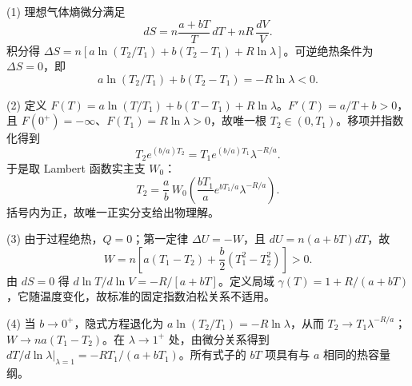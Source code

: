 (1) 理想气体熵微分满足
\[
dS=n\frac{a+bT}{T}\,dT+nR\,\frac{dV}{V}.
\]
积分得 \(\Delta S=n[a\ln(T_2/T_1)+b(T_2-T_1)+R\ln\lambda]\)。可逆绝热条件为 \(\Delta S=0\)，即
\[
a\ln(T_2/T_1)+b(T_2-T_1)=-R\ln\lambda<0.
\]

(2) 定义 \(F(T)=a\ln(T/T_1)+b(T-T_1)+R\ln\lambda\)。\(F'(T)=a/T+b>0\)，且 \(F(0^+)=-\infty\)、\(F(T_1)=R\ln\lambda>0\)，故唯一根 \(T_2\in(0,T_1)\)。移项并指数化得到
\[
T_2e^{(b/a)T_2}=T_1e^{(b/a)T_1}\lambda^{-R/a}.
\]
于是取 Lambert 函数实主支 \(W_0\)：
\[
T_2=\frac ab\,W_0\!\left(\frac{bT_1}{a}e^{bT_1/a}\lambda^{-R/a}\right).
\]
括号内为正，故唯一正实分支给出物理解。

(3) 由于过程绝热，\(Q=0\)；第一定律 \(\Delta U=-W\)，且 \(dU=n(a+bT)dT\)，故
\[
W=n\left[a(T_1-T_2)+\frac b2(T_1^2-T_2^2)\right]>0.
\]
由 \(dS=0\) 得 \(d\ln T/d\ln V=-R/[a+bT]\)。定义局域 \(\gamma(T)=1+R/(a+bT)\)，它随温度变化，故标准的固定指数泊松关系不适用。

(4) 当 \(b\to0^+\)，隐式方程退化为 \(a\ln(T_2/T_1)=-R\ln\lambda\)，从而 \(T_2\to T_1\lambda^{-R/a}\)；\(W\to na(T_1-T_2)\)。在 \(\lambda\to1^+\) 处，由微分关系得到 \(dT/d\ln\lambda|_{\lambda=1}=-RT_1/(a+bT_1)\)。所有式子的 \(bT\) 项具有与 \(a\) 相同的热容量纲。
